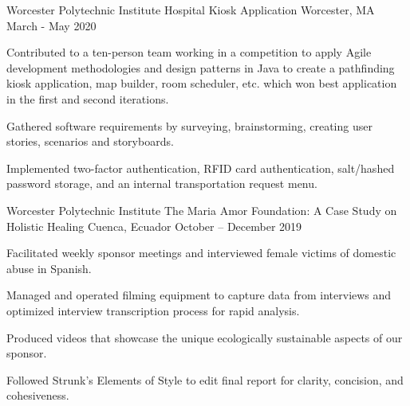 

\begin{cventries}

  \cventry
    {Worcester Polytechnic Institute} %
    {Hospital Kiosk Application } %
    {Worcester, MA} %
    {March - May 2020} %
    {
      \begin{cvitems} %
       \item {Contributed to a ten-person team working in a competition to apply Agile development methodologies and
        design patterns in Java to create a pathfinding kiosk application, map builder, room scheduler, etc. which won best application in the first and second iterations.}
        \item {Gathered software requirements by surveying, brainstorming, creating user stories, scenarios and storyboards.}
        \item {Implemented two-factor authentication, RFID card authentication, salt/hashed password storage, and an internal transportation request menu.}
      \end{cvitems}
    }


  \cventry
    {Worcester Polytechnic Institute} %
    {The Maria Amor Foundation: A Case Study on Holistic Healing} %
    {Cuenca, Ecuador} %
    {October – December 2019} %
    {
      \begin{cvitems} %
        \item {Facilitated weekly sponsor meetings and interviewed female victims of domestic abuse in Spanish.}
        \item {Managed and operated filming equipment to capture data from
        interviews and optimized interview transcription process for rapid analysis.}
        \item {Produced videos that showcase the unique ecologically sustainable aspects of our sponsor.}
        \item {Followed
        Strunk’s Elements of Style to edit final report for clarity, concision, and cohesiveness.}
      \end{cvitems}
    }

\end{cventries}
